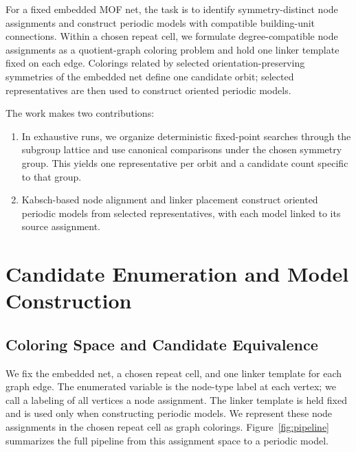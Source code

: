 \documentclass[a5paper, 10pt]{article}
\begin{document}
For a fixed embedded MOF net, the task is to identify symmetry-distinct node assignments and construct periodic models with compatible building-unit connections. Within a chosen repeat cell, we formulate degree-compatible node assignments as a quotient-graph coloring problem and hold one linker template fixed on each edge. Colorings related by selected orientation-preserving symmetries of the embedded net define one candidate orbit; selected representatives are then used to construct oriented periodic models.%

The work makes two contributions:%
\begin{enumerate}
    \item In exhaustive runs, we organize deterministic fixed-point searches through the subgroup lattice and use canonical comparisons under the chosen symmetry group. This yields one representative per orbit and a candidate count specific to that group.
    \item Kabsch-based node alignment and linker placement construct oriented periodic models from selected representatives, with each model linked to its source assignment.
\end{enumerate}

\clearpage
\section{Candidate Enumeration and Model Construction}



\subsection{Coloring Space and Candidate Equivalence}


\label{sec:theory}
We fix the embedded net, a chosen repeat cell, and one linker template for each graph edge. The enumerated variable is the node-type label at each vertex; we call a labeling of all vertices a node assignment. The linker template is held fixed and is used only when constructing periodic models. We represent these node assignments in the chosen repeat cell as graph colorings. Figure~\ref{fig:pipeline} summarizes the full pipeline from this assignment space to a periodic model.
\end{document}

